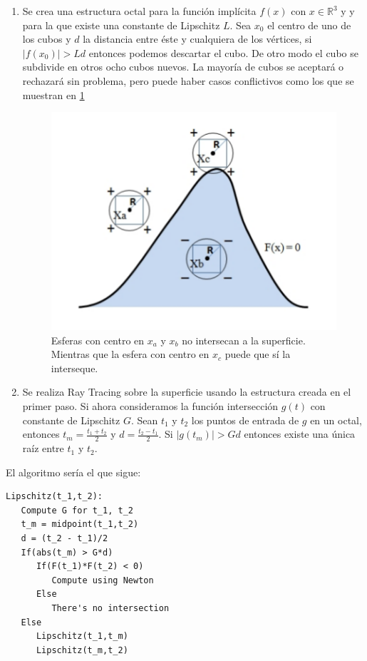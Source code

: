 \begin{enumerate}
\item Se crea una estructura octal para la función implícita $f(x)$ con $x \in \mathbb{R}^3$ y y para la que existe una constante de Lipschitz $L$. Sea $x_0$ el centro de uno de los cubos y $d$ la distancia entre éste y cualquiera de los vértices, si $|f(x_0)| > Ld$ entonces podemos descartar el cubo. De otro modo el cubo se subdivide en otros ocho cubos nuevos. La mayoría de cubos se aceptará o rechazará sin problema, pero puede haber casos conflictivos como los que se muestran en \ref{florez411}

\begin{figure}[h]
	\centering
	\includegraphics[scale=0.5]{images/florez9.png}
	\caption{Esferas con centro en $x_a$ y $x_b$ no intersecan a la superficie. Mientras que la esfera con centro en $x_c$ puede que sí la interseque.}
	\label{florez411}
\end{figure}

\item Se realiza Ray Tracing sobre la superficie usando la estructura creada en el primer paso. Si ahora consideramos la función intersección $g(t)$ con constante de Lipschitz $G$. Sean $t_1$ y $t_2$ los puntos de entrada de $g$ en un octal, entonces $t_m = \frac{t_1 + t_2}{2}$ y $d = \frac{t_2 - t_1}{2}$. Si $|g(t_m)| > Gd$ entonces existe una única raíz entre $t_1$ y $t_2$. 

\end{enumerate}

El algoritmo sería el que sigue:

\begin{verbatim}
Lipschitz(t_1,t_2):
   Compute G for t_1, t_2
   t_m = midpoint(t_1,t_2)
   d = (t_2 - t_1)/2
   If(abs(t_m) > G*d)
      If(F(t_1)*F(t_2) < 0)
         Compute using Newton
      Else
         There's no intersection
   Else
      Lipschitz(t_1,t_m)
      Lipschitz(t_m,t_2)
\end{verbatim}

